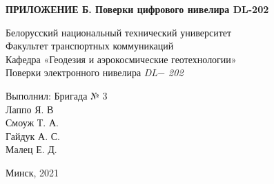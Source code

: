 \documentclass[a4paper]{article}
\begin{document}
\begin{titlepage}
\begin{flushright}
  \large{\textbf{ПРИЛОЖЕНИЕ Б. Поверки цифрового нивелира DL-202}}
\end{flushright}
\begin{center}
\large{Белорусский национальный технический университет}\\
\large{Факультет транспортных коммуникаций}\\
\large{Кафедра «Геодезия и аэрокосмические геотехнологии»}\\
\hfill \break
\hfill \break
\hfill \break
\hfill \break
\hfill \break
\hfill \break
\hfill \break
\hfill \break
\large{Поверки электронного нивелира \textit{DL$-$ 202}\\}
\hfill \break
\hfill \break
\hfill \break
\hfill \break
\hfill \break
\hfill \break
\end{center}
\begin{flushright}
  \large{Выполнил: Бригада № 3 \\
	Лаппо Я. В\\
	Смоуж Т. А.\\
	Гайдук А. С.\\
	Малец Е. Д.\\
	}
\end{flushright}
\begin{center}
\hfill \break
\hfill \break
\large{Минск, 2021\\}
\end{center}
\end{titlepage}
\setcounter{page}{21}
\end{document}
